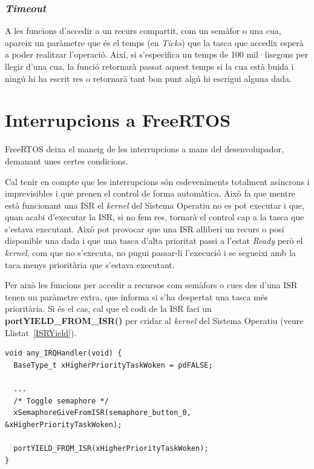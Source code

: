 \subsubsection{\em Timeout}
A les funcions d'accedir a un recurs compartit, com un semàfor o una cua, apareix un paràmetre que és el temps (en {\em Ticks}) que la tasca que accedix esperà a poder realitzar l'operació. Així, si s'especifica un temps de 100 mil·lisegons per llegir d'una cua, la funció retornarà passat aquest temps si la cua està buida i ningú hi ha escrit res o retornarà tant bon punt algú hi escrigui alguna dada.

\section{Interrupcions a FreeRTOS}
\label{ch:FreeRTOSIRQ}

FreeRTOS deixa el maneig de les interrupcions a mans del desenvolupador, demanant unes certes condicions.

Cal tenir en compte que les interrupcions són esdeveniments totalment asíncrons i imprevisibles i que prenen el control de forma automàtica. Això fa que mentre està funcionant una \gls{ISR} el {\em kernel} del Sistema Operatiu no es pot executar i que, quan acabi d'executar la ISR, si no fem res, tornarà el control cap a la tasca que s'estava executant. Això pot provocar que una ISR alliberi un recurs o posi disponible una dada i que una tasca d'alta prioritat passi a l'estat {\em Ready} però el {\em kernel}, com que no s'executa, no pugui passar-li l'execució i se segueixi amb la taca menys prioritària que s'estava executant.

Per això les funcions per accedir a recursos com semàfors o cues des d'una \gls{ISR} tenen un paràmetre extra, que informa si s'ha despertat una tasca més prioritària. Si és el cas, cal que el codi de la ISR faci un {\bf portYIELD\_FROM\_ISR()} per cridar al {\em kernel} del Sistema Operatiu (veure Llistat~\ref{ISRYield}).

\begin{lstlisting}[style=customc,caption=Codi ISR d'exemple,label=ISRYield]
void any_IRQHandler(void) {
  BaseType_t xHigherPriorityTaskWoken = pdFALSE;

  ...
  /* Toggle semaphore */
  xSemaphoreGiveFromISR(semaphore_button_0, &xHigherPriorityTaskWoken);

  portYIELD_FROM_ISR(xHigherPriorityTaskWoken);
}
\end{lstlisting}

